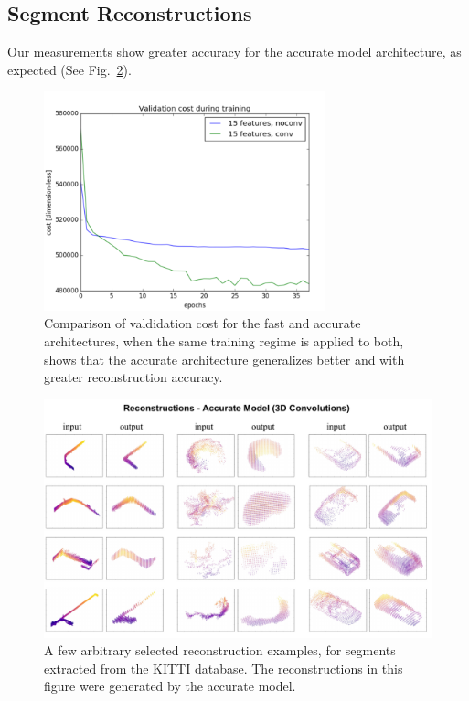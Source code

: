 \subsection{Segment Reconstructions}

Our measurements show greater accuracy for the accurate model architecture, as expected (See Fig.~\ref{fig:trainingcost}).\\

\begin{figure}
  \centering
  \includegraphics[width=3.2in]{images/trainingcost.png}
  \caption{Comparison of valdidation cost for the fast and accurate architectures, when the same training regime is applied to both, shows that the accurate architecture generalizes better and with greater reconstruction accuracy.}
  \label{fig:trainingcost}
\end{figure}

\begin{figure}
  \centering
  \includegraphics[width=5.2in]{images/convreconstructions.pdf}
  \caption{A few arbitrary selected reconstruction examples, for segments extracted from the KITTI database. The reconstructions in this figure were generated by the accurate model.}
  \label{fig:trainingcost}
\end{figure}

